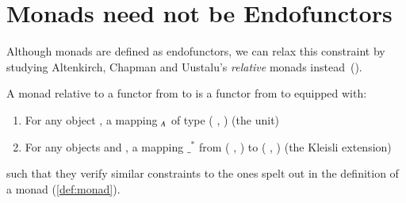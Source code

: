 \begin{example}[Maybe]\todo{}
\end{example}

\begin{example}\todo{}
\end{example}

\section{Monads need not be Endofunctors}\label{sec:relativemonad}

Although monads are defined as endofunctors, we can relax this
constraint by studying Altenkirch, Chapman and Uustalu's
\emph{relative} monads instead~(\citeyear{Altenkirch2010,JFR4389}).

\begin{definition}
\label{def:relative-monad}
A monad relative to a functor  from  to 
is a functor  from  to  equipped with:
\begin{enumerate}
  \item For any object , a mapping $_{\AB{A}}$ of type
    {( ,  )} (the unit)
  \item For any objects  and , a mapping $\_^*$
    from {( ,  )}
    to {( ,  )} (the Kleisli extension)
\end{enumerate}

such that they verify similar constraints to the ones spelt out in the
definition of a monad (\ref{def:monad}).
\end{definition}
